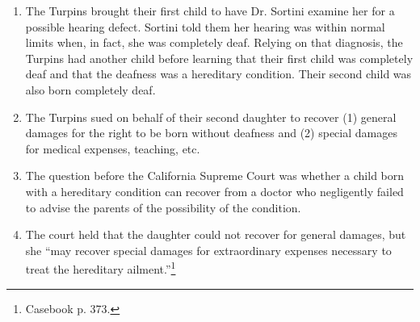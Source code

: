 \begin{enumerate}
    \item The Turpins brought their first child to have Dr. Sortini examine 
    her for a possible hearing defect. Sortini told them her hearing was 
    within normal limits when, in fact, she was completely deaf. Relying on 
    that diagnosis, the Turpins had another child before learning that their 
    first child was completely deaf and that the deafness was a hereditary 
    condition. Their second child was also born completely deaf.
    \item The Turpins sued on behalf of their second daughter to recover (1) 
    general damages for the right to be born without deafness and (2) special 
    damages for medical expenses, teaching, etc.
    \item The question before the California Supreme Court was whether a child 
    born with a hereditary condition can recover from a doctor who negligently 
    failed to advise the parents of the possibility of the condition.
    \item The court held that the daughter could not recover for general 
    damages, but she ``may recover special damages for extraordinary expenses 
    necessary to treat the hereditary ailment.''\footnote{Casebook p. 373.}
\end{enumerate}
